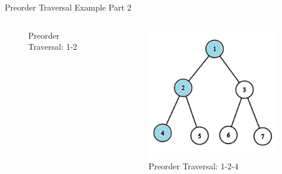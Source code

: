 \documentclass[aspectratio=169]{beamer}%
\begin{document}
\begin{frame}{Preorder Traversal Example Part 2}
\begin{columns}
\begin{column}{0.32\textwidth}
\begin{figure}
                \caption{Preorder Traversal: 1-2}
            \end{figure}
        \end{column}
        \hfill
        \begin{column}{0.32\textwidth}
            \begin{figure}
                \centering
                \includegraphics[width = .9\linewidth]{tree-pre 6.png}
                \caption{Preorder Traversal: 1-2-4}
            \end{figure}
        \end{column}
    \end{columns}
\end{frame}
\end{document}
